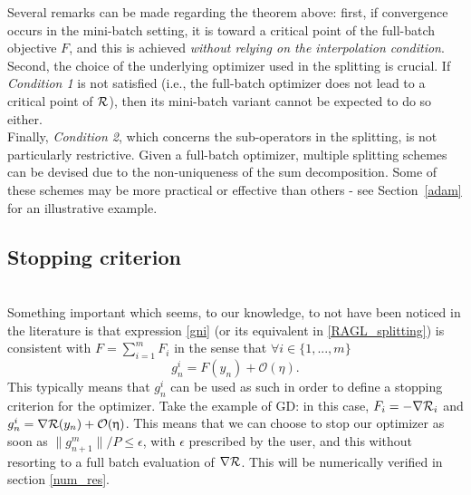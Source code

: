 \documentclass[article,authoryear,jmlmc]{beg_32}             %
\begin{document}
Several remarks can be made regarding the theorem above:
first, if convergence occurs in the mini-batch setting, it is toward a critical point of the full-batch objective $F$, and this is achieved {\em without relying on the
interpolation condition}.\\
Second, the choice of the underlying optimizer used in the splitting is crucial. If {\em Condition 1} is not satisfied (i.e., the full-batch optimizer does not lead to a critical
point of $\mathcal{R}$), then its mini-batch variant cannot be expected to do so either.\\
Finally, {\em Condition 2}, which concerns the sub-operators in the splitting, is not particularly restrictive. Given a full-batch optimizer, multiple splitting schemes can be devised due to the non-uniqueness of the sum decomposition. Some of these schemes may be more practical or effective than others - see Section~\ref{adam} for an illustrative example.

\subsection{Stopping criterion}
~~\\
Something important which seems, to our knowledge, to not have been noticed in the literature is that 
  expression \eqref{gni} (or its equivalent in \eqref{RAGL_splitting}) is consistent with $F=\sum_{i=1}^m F_i$ in the sense that $\forall i\in\{1,...,m\}$ 
  \begin{equation}
    \label{stopping_criterion}
    g_n^i = F(y_n) +\mathcal{O}(\eta). 
  \end{equation}
  This typically means that $g_n^i$ can be used as such in order to define a stopping criterion for the optimizer.
  Take the example of GD: in this case, $F_i=-\nabla \mathcal{R}_i$ and $g_n^i = \nabla \mathcal{R}(y_n)+\mathcal{O}(\upeta)$. This means that we can choose to stop our optimizer as soon as $\|g_{n+1}^m\|/P \leq
  \epsilon$, with $\epsilon$ prescribed by the user, and this without resorting to a full batch evaluation of $\nabla \mathcal{R}$. This will be numerically verified in section \ref{num_res}. \\
\ \\
\end{document}
